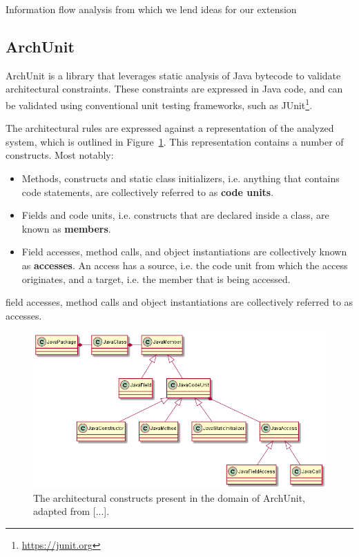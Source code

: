 \cite{pistoia_survey_2007}

Information flow analysis \cite{hutchison_information_2005} from which we lend ideas for our extension


\subsection{ArchUnit}\label{archunit-back-section}
ArchUnit is a library that leverages static analysis of Java bytecode to validate architectural constraints. These constraints are expressed in Java code, and can be validated using conventional unit testing frameworks, such as JUnit\footnote{\url{https://junit.org}}.

The architectural rules are expressed against a representation of the analyzed system, which is outlined in Figure~\ref{fig:archunit}. This representation contains a number of constructs. Most notably:

\begin{itemize}
    \item Methods, constructs and static class initializers, i.e. anything that contains code statements, are collectively referred to as \textbf{code units}.
    \item Fields and code units, i.e. constructs that are declared inside a class, are known as \textbf{members}.
    \item Field accesses, method calls, and object instantiations are collectively known as \textbf{accesses}. An access has a source, i.e. the code unit from which the access originates, and a target, i.e. the member that is being accessed.
\end{itemize}



field accesses, method calls and object instantiations are collectively referred to as accesses.

\begin{figure}
    \centering
    \includegraphics[width=\textwidth]{figure/ArchUnit.png}
    \caption{The architectural constructs present in the domain of ArchUnit, adapted from [...].}
    \label{fig:archunit}
\end{figure}


